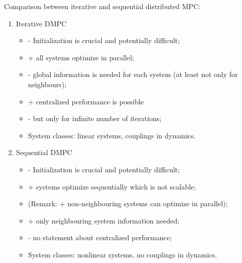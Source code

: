     Comparison between iterative and sequential distributed MPC:\\
    \begin{enumerate}
        \item Iterative DMPC
        \begin{itemize}
            \item - Initialization is crucial and potentially difficult;
            \item + all systems optimize in parallel;
            \item - global information is needed for each system (at least not only for neighbours);
            \item + centralized performance is possible
            \item - but only for infinite number of iterations;
            \item System classes: linear systems, couplings in dynamics.
        \end{itemize}
        \item Sequential DMPC
        \begin{itemize}
            \item - Initialization is crucial and potentially difficult;
            \item + systems optimize sequentially which is not scalable;
            \item (Remark: + non-neighbouring systems can optimize in parallel);
            \item + only neighbouring system information needed;
            \item - no statement about centralized performance;
            \item System classes: nonlinear systems, no couplings in dynamics.
        \end{itemize}
    \end{enumerate}